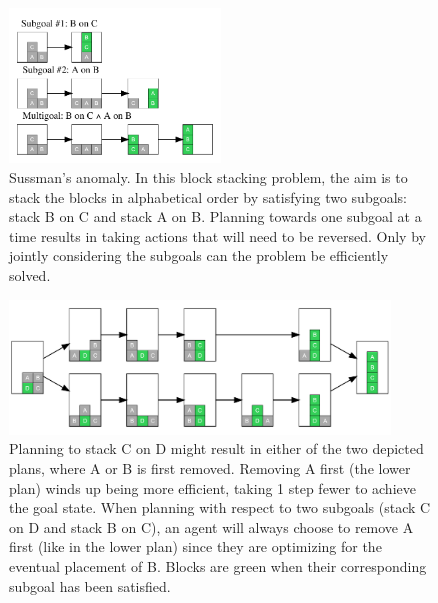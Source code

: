 \documentclass[10pt,letterpaper]{article}
\newcommand{\todo}[1]{\textcolor{red}{\textsc{[TODO: #1]}}}
\begin{document}


\begin{figure}[ht!]
    \centering
    \includegraphics[width=0.5\textwidth]{example-suss}
    \caption{Sussman's anomaly. In this block stacking problem, the aim is to stack the blocks in alphabetical order by satisfying two subgoals: stack B on C and stack A on B. Planning towards one subgoal at a time results in taking actions that will need to be reversed. Only by jointly considering the subgoals can the problem be efficiently solved.}
    \label{fig:suss}
\end{figure}

\begin{figure}[ht]
    \centering
    \includegraphics[width=0.9\textwidth]{example-4-block}
    \caption{Planning to stack C on D might result in either of the two depicted plans, where A or B is first removed. Removing A first (the lower plan) winds up being more efficient, taking 1 step fewer to achieve the goal state. When planning with respect to two subgoals (stack C on D and stack B on C), an agent will always choose to remove A first (like in the lower plan) since they are optimizing for the eventual placement of B. Blocks are green when their corresponding subgoal has been satisfied.}
    \label{fig:fourblock}
\end{figure}
\end{document}
